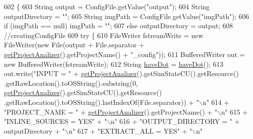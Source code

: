 \begin{DoxyCode}
602                                       \{
603         String output = ConfigFile.getValue(\textcolor{stringliteral}{"output"});
604         String outputDirectory = \textcolor{stringliteral}{""};
605         String imgPath = ConfigFile.getValue(\textcolor{stringliteral}{"imgPath"});
606         \textcolor{keywordflow}{if} (imgPath == null)    imgPath = \textcolor{stringliteral}{""};
607         \textcolor{keywordflow}{else}    outputDirectory = output;
608         \textcolor{comment}{//creatingConfigFile}
609         \textcolor{keywordflow}{try} \{
610             FileWriter fstreamWrite = \textcolor{keyword}{new} FileWriter(\textcolor{keyword}{new} File(output + File.separator + 
      \hyperlink{classit_1_1isislab_1_1masonassisteddocumentation_1_1mason_1_1analizer_1_1_global_utility_a78cbdc6022c558d1375a01095ad95659}{getProjectAnalizer}().getProjectName() + \textcolor{stringliteral}{"\_config"}));
611             BufferedWriter out = \textcolor{keyword}{new} BufferedWriter(fstreamWrite);
612             String \hyperlink{classit_1_1isislab_1_1masonassisteddocumentation_1_1mason_1_1analizer_1_1_global_utility_a396066731dbc923fe85d28988511ba46}{haveDot} = \hyperlink{classit_1_1isislab_1_1masonassisteddocumentation_1_1mason_1_1analizer_1_1_global_utility_a396066731dbc923fe85d28988511ba46}{haveDot}();
613             out.write(\textcolor{stringliteral}{"INPUT = "} + \hyperlink{classit_1_1isislab_1_1masonassisteddocumentation_1_1mason_1_1analizer_1_1_global_utility_a78cbdc6022c558d1375a01095ad95659}{getProjectAnalizer}().getSimStateCU().getResource()
      .getRawLocation().toOSString().substring(0, \hyperlink{classit_1_1isislab_1_1masonassisteddocumentation_1_1mason_1_1analizer_1_1_global_utility_a78cbdc6022c558d1375a01095ad95659}{getProjectAnalizer}().getSimStateCU().getResource()
      .getRawLocation().toOSString().lastIndexOf(File.separator)) + \textcolor{stringliteral}{"\(\backslash\)n"}
614                     + \textcolor{stringliteral}{"PROJECT\_NAME = "} + \hyperlink{classit_1_1isislab_1_1masonassisteddocumentation_1_1mason_1_1analizer_1_1_global_utility_a78cbdc6022c558d1375a01095ad95659}{getProjectAnalizer}().getProjectName() + \textcolor{stringliteral}{"\(\backslash\)n"}
615                     + \textcolor{stringliteral}{"INLINE\_SOURCES = YES"} + \textcolor{stringliteral}{"\(\backslash\)n"}
616                     + \textcolor{stringliteral}{"OUTPUT\_DIRECTORY = "} + outputDirectory + \textcolor{stringliteral}{"\(\backslash\)n"}
617                     + \textcolor{stringliteral}{"EXTRACT\_ALL = YES"} + \textcolor{stringliteral}{"\(\backslash\)n"}

\end{DoxyCode}
